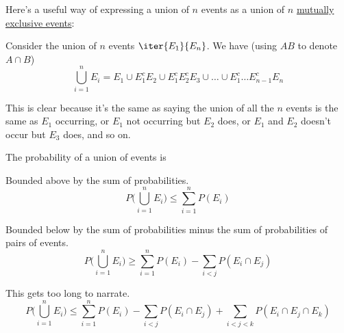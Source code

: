\Lemma{}\label{e3a2218}

Here's a useful way of expressing a union of $n$ events as a union of $n$
\href{a16826f}{mutually exclusive events}:

Consider the union of $n$ events $\iter{E_1}{E_n}$. We have (using $AB$ to
denote $A\cap B$)
$$
  \bigcup_{i=1}^nE_i
  =E_1\cup E_1^cE_2\cup E_1^cE_2^cE_3\cup\ldots\cup E_1^c\ldots E_{n-1}^cE_n
$$

This is clear because it's the same as saying the union of all the $n$ events
is the same as $E_1$ occurring, or $E_1$ not occurring but $E_2$ does, or $E_1$
and $E_2$ doesn't occur but $E_3$ does, and so on.

\label{f9f9472}

The probability of a union of events is
\begin{enumerati}
  \item Bounded above by the sum of probabilities.
  $$
    P\biggl(\bigcup_{i=1}^nE_i\biggr)\leq\sum_{i=1}^nP(E_i)
  $$
  \item Bounded below by the sum of probabilities minus the sum of
        probabilities of pairs of events.
  $$
    P\biggl(\bigcup_{i=1}^nE_i\biggr)\geq\sum_{i=1}^nP(E_i)-\sum_{i<j}P(E_i\cap E_j)
  $$
  \item This gets too long to narrate.
  $$
    P\biggl(\bigcup_{i=1}^nE_i\biggr)\leq\sum_{i=1}^nP(E_i)-\sum_{i<j}P(E_i\cap E_j)+\sum_{i<j<k}P(E_i\cap E_j\cap E_k)
  $$
\end{enumerati}
